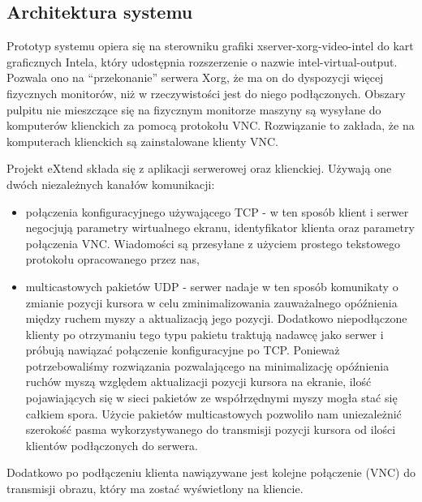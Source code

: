     \vfill

  \subsection{Architektura systemu}

    Prototyp systemu opiera się na sterowniku grafiki xserver-xorg-video-intel do kart graficznych Intela, który udostępnia rozszerzenie o nazwie intel-virtual-output. Pozwala ono na ``przekonanie'' serwera Xorg, że ma on do dyspozycji więcej fizycznych monitorów, niż w rzeczywistości jest do niego podłączonych. Obszary pulpitu nie mieszczące się na fizycznym monitorze maszyny są wysyłane do komputerów klienckich za pomocą protokołu VNC. Rozwiązanie to zakłada, że na komputerach klienckich są zainstalowane klienty VNC.


    Projekt eXtend składa się z aplikacji serwerowej oraz klienckiej. Używają one dwóch niezależnych kanałów komunikacji:
    \begin{itemize}
      \item połączenia konfiguracyjnego używającego TCP - w ten sposób klient i serwer negocjują parametry wirtualnego ekranu, identyfikator klienta oraz parametry połączenia VNC. Wiadomości są przesyłane z użyciem prostego tekstowego protokołu opracowanego przez nas,
      \item multicastowych pakietów UDP - serwer nadaje w ten sposób komunikaty o zmianie pozycji kursora w celu zminimalizowania zauważalnego opóźnienia między ruchem myszy a aktualizacją jego pozycji. Dodatkowo niepodłączone klienty po otrzymaniu tego typu pakietu traktują nadawcę jako serwer i próbują nawiązać połączenie konfiguracyjne po TCP. Ponieważ potrzebowaliśmy rozwiązania pozwalającego na minimalizację opóźnienia ruchów myszą względem aktualizacji pozycji kursora na ekranie, ilość pojawiających się w sieci pakietów ze współrzędnymi myszy mogła stać się całkiem spora. Użycie pakietów multicastowych pozwoliło nam uniezależnić szerokość pasma wykorzystywanego do transmisji pozycji kursora od ilości klientów podłączonych do serwera.
    \end{itemize}

    Dodatkowo po podłączeniu klienta nawiązywane jest kolejne połączenie (VNC) do transmisji obrazu, który ma zostać wyświetlony na kliencie.


